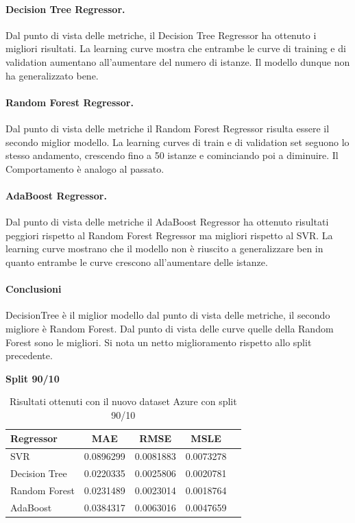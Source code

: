\paragraph{\textbf{Decision Tree Regressor}.}
Dal punto di vista delle metriche, il Decision Tree Regressor ha ottenuto i migliori risultati.
La learning curve mostra che entrambe le curve di training e di validation aumentano all'aumentare del numero di istanze. Il modello dunque non ha generalizzato bene.
\paragraph{\textbf{Random Forest Regressor}.}
Dal punto di vista delle metriche il Random Forest Regressor risulta essere il secondo miglior modello.
La learning curves di train e di validation set seguono lo stesso andamento, crescendo fino a 50 istanze e cominciando poi a diminuire. Il Comportamento è analogo al passato.
\paragraph{\textbf{AdaBoost Regressor}.}
Dal punto di vista delle metriche il AdaBoost Regressor ha ottenuto risultati peggiori rispetto al Random Forest Regressor ma migliori rispetto al SVR.
La learning curve mostrano che il modello non è riuscito a generalizzare ben in quanto entrambe le curve crescono all'aumentare delle istanze.

\paragraph{\textbf{Conclusioni}} DecisionTree è il miglior modello dal punto di vista delle metriche, il secondo migliore è Random Forest. Dal punto di vista delle curve quelle della Random Forest sono le migliori. Si nota un netto miglioramento rispetto allo split precedente.

\noindent\textbf{Split 90/10}

\begin{table}[H]
    \centering
    \begin{tabular}{|>{\centering\arraybackslash}m{5cm}|c|c|c|c|}
        \hline
        \textbf{Regressor} & \textbf{MAE} & \textbf{RMSE} & \textbf{MSLE} \\ [10pt]
        \hline
        SVR & 0.0896299 & 0.0081883 & 0.0073278 \\ [10pt]
        \hline
        Decision Tree & 0.0220335 & 0.0025806 & 0.0020781 \\ [10pt]
        \hline
        Random Forest & 0.0231489 & 0.0023014 & 0.0018764 \\ [10pt]
        \hline
        AdaBoost & 0.0384317 & 0.0063016 & 0.0047659 \\ [10pt]
        \hline
    \end{tabular}
    \caption{Risultati ottenuti con il nuovo dataset Azure con split 90/10}
    \label{tab:results}
\end{table}


